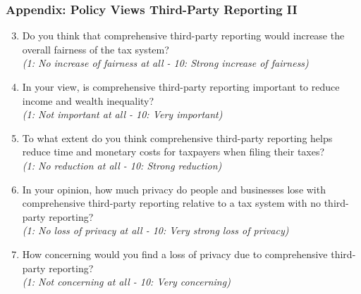 \documentclass{beamer}
\begin{document}
\begin{frame}
\frametitle{Appendix: Policy Views Third-Party Reporting II}
\footnotesize
\begin{enumerate}
    \setcounter{enumi}{2}
    \item Do you think that comprehensive third-party reporting would increase the overall fairness of the tax system?\\
    \textit{(1: No increase of fairness at all - 10: Strong increase of fairness)}
    \item In your view, is comprehensive third-party reporting important to reduce income and wealth inequality?\\
    \textit{(1: Not important at all - 10: Very important)}
    \item To what extent do you think comprehensive third-party reporting helps reduce time and monetary costs for taxpayers when filing their taxes?\\
    \textit{(1: No reduction at all - 10: Strong reduction)}
    \item In your opinion, how much privacy do people and businesses lose with comprehensive third-party reporting relative to a tax system with no third-party reporting?\\
    \textit{(1: No loss of privacy at all - 10: Very strong loss of privacy)}
    \item How concerning would you find a loss of privacy due to comprehensive third-party reporting?\\
    \textit{(1: Not concerning at all - 10: Very concerning)}
\end{enumerate}
\vfill
\hfill 
\hyperlink{Third_Party_Reporting}{}
\end{frame}
\end{document}
